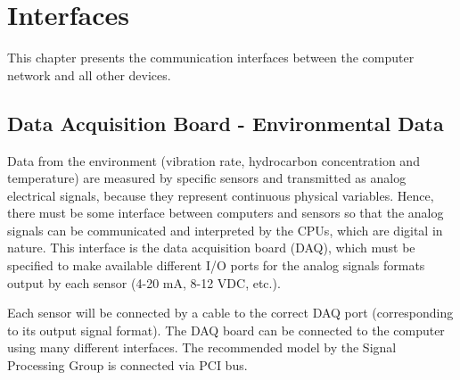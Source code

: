 



\chapter{Interfaces}
This chapter presents the communication interfaces between the computer network and all other devices.
\newpage




\section{Data Acquisition Board - Environmental Data}
Data from the environment (vibration rate, hydrocarbon concentration and temperature) are measured by specific sensors and transmitted as analog electrical signals, because they represent continuous physical variables. Hence, there must be some interface between computers and sensors so that the analog signals can be communicated and interpreted by the CPUs, which are digital in nature. This interface is the data acquisition board (DAQ), which must be specified to make available different I/O ports for the analog signals formats output by each sensor (4-20 mA, 8-12 VDC, etc.).

Each sensor will be connected by a cable to the correct DAQ port (corresponding to its output signal format). The DAQ board can be connected to the computer using many different interfaces. The recommended model by the Signal Processing Group is connected via PCI bus.

